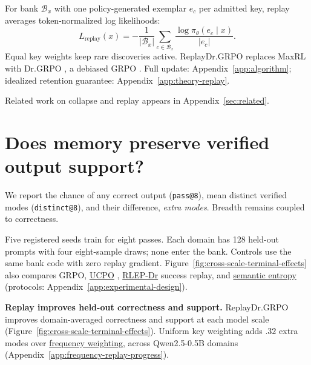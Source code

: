 For bank $\mathcal B_x$ with one policy-generated exemplar $e_c$ per admitted
key, replay averages token-normalized log likelihoods:
\begin{equation}
L_{\mathrm{replay}}(x)=-\frac{1}{|\mathcal B_x|}
\sum_{c\in\mathcal B_x}\frac{\log\pi_\theta(e_c\mid x)}{|e_c|}.
\label{eq:lm-verified-replay}
\end{equation}
Equal key weights keep rare discoveries active. ReplayDr.GRPO replaces MaxRL
with Dr.GRPO \citep{liu2025understanding}, a debiased GRPO
\citep{shao2024deepseekmath}. Full update: Appendix~\ref{app:algorithm};
idealized retention guarantee: Appendix~\ref{app:theory-replay}.

Related work on collapse and replay appears in Appendix~\ref{sec:related}.

\section{Does memory preserve verified output support?}
\label{sec:experiments}\label{sec:results}
We report the chance of any correct output (\texttt{pass@8}), mean distinct
verified modes (\texttt{distinct@8}), and their difference, \emph{extra modes}.
Breadth remains coupled to correctness.

Five registered seeds train for eight passes. Each domain has 128 held-out
prompts with four eight-sample draws; none enter the bank. Controls use the same
bank code with zero replay gradient. Figure~\ref{fig:cross-scale-terminal-effects}
also compares GRPO,
\href{https://huggingface.co/od2961/maxent-grpo-models/blob/main/EXPERIMENTS.md\#direct-comparators}{UCPO} \citep{lochab2026ucpo}, \href{https://huggingface.co/od2961/maxent-grpo-models/blob/main/EXPERIMENTS.md\#direct-comparators}{RLEP-Dr} success replay, and \href{https://huggingface.co/od2961/maxent-grpo-models/blob/main/EXPERIMENTS.md\#semantic-ablations}{semantic entropy}
(protocols: Appendix~\ref{app:experimental-design}).



\noindent\textbf{Replay improves held-out correctness and support.}
\label{sec:results-retention}
ReplayDr.GRPO improves domain-averaged correctness and support at each model
scale (Figure~\ref{fig:cross-scale-terminal-effects}).
Uniform key weighting adds $.32$ extra modes over \href{https://huggingface.co/od2961/maxent-grpo-models/blob/main/experiments/E120-R1/README.md\#models}{frequency weighting},
across Qwen2.5-0.5B domains
(Appendix~\ref{app:frequency-replay-progress}).


